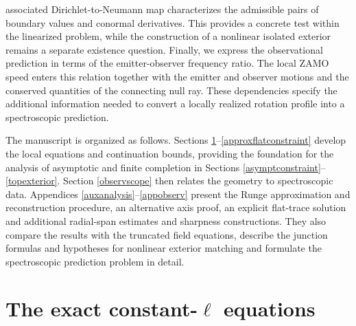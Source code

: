 \documentclass[amsmath,amsfonts,amssymb,aps,pra,superscriptaddress,10pt]{revtex4-2}
\numberwithin{equation}{section}
\theoremstyle{plain}
\theoremstyle{definition}
\theoremstyle{remark}
\theoremstyle{definition}
\begin{document}
associated Dirichlet-to-Neumann map characterizes the admissible pairs of boundary values and conormal derivatives. This provides a concrete test within the linearized problem, while the construction of a nonlinear isolated exterior remains a separate existence question. Finally, we express the observational prediction in terms of the emitter-observer frequency ratio. The local ZAMO speed enters this relation together with the emitter and observer motions and the conserved quantities of the connecting null ray. These dependencies specify the additional information needed to convert a locally realized rotation profile into a spectroscopic prediction.

The manuscript is organized as follows. Sections \ref{modeframew}–\ref{approxflatconstraint} develop the local equations and continuation bounds, providing the foundation for the analysis of asymptotic and finite completion in Sections \ref{asymptconstraint}–\ref{topexterior}. Section \ref{observscope} then relates the geometry to spectroscopic data. Appendices \ref{auxanalysis}–\ref{appobserv} present the Runge approximation and reconstruction procedure, an alternative axis proof, an explicit flat-trace solution and additional radial-span estimates and sharpness constructions. They also compare the results with the truncated field equations, describe the junction formulas and hypotheses for nonlinear exterior matching and formulate the spectroscopic prediction problem in detail. 


\section{The exact constant-\texorpdfstring{$\ell$}{ell} equations}\label{modeframew}
\end{document}
